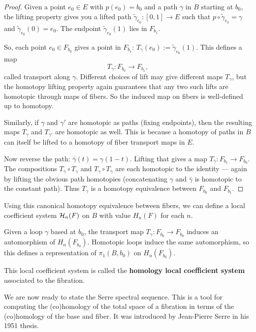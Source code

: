 \documentclass[12pt]{article}
\begin{document}
\begin{proof}
    Given a point $e_0\in E$ with $p(e_0)=b_0$ and a path $\gamma$ in $B$ starting at $b_0$, the lifting property gives you a lifted path $\widetilde\gamma_{e_0} : [0,1]\to E$ such that $p\circ \widetilde\gamma_{e_0} = \gamma$ and $\widetilde\gamma_{e_0}(0)=e_0$. The endpoint $\widetilde\gamma_{e_0}(1)$ lies in $F_{b_1}$.

    So, each point $e_0\in F_{b_0}$ gives a point in $F_{b_1}$: $T_\gamma(e_0) := \widetilde\gamma_{e_0}(1)$. This defines a map
    \[T_\gamma : F_{b_0} \longrightarrow F_{b_1},\]
    called transport along $\gamma$. Different choices of lift may give different maps $T_\gamma$, but the homotopy lifting property again guarantees that any two such lifts are homotopic through maps of fibers. So the induced map on fibers is well-defined up to homotopy.

    Similarly, if $\gamma$ and $\gamma'$ are homotopic as paths (fixing endpoints), then the resulting maps $T_\gamma$ and $T_{\gamma'}$ are homotopic as well. This is because a homotopy of paths in $B$ can itself be lifted to a homotopy of fiber transport maps in $E$.

    Now reverse the path: $\bar\gamma(t) = \gamma(1-t)$. Lifting that gives a map $T_{\bar\gamma}:F_{b_1}\to F_{b_0}$. The compositions $T_{\bar\gamma}\circ T_\gamma$ and $T_\gamma\circ T_{\bar\gamma}$ are each homotopic to the identity — again by lifting the obvious path homotopies (concatenating $\gamma$ and $\bar\gamma$ is homotopic to the constant path). Thus $T_\gamma$ is a homotopy equivalence between $F_{b_0}$ and $F_{b_1}$.
\end{proof}
Using this canonical homotopy equivalence between fibers, we can define a local coefficient system ${\mathcal{H}}_n(F)$ on $B$ with value $H_n(F)$ for each $n$.
\begin{definition}
     Given a loop $\gamma$ based at $b_0$, the transport map $T_\gamma : F_{b_0} \to F_{b_0}$ induces an automorphism of $H_n(F_{b_0})$. Homotopic loops induce the same automorphism, so this defines a representation of $\pi_1(B,b_0)$ on $H_n(F_{b_0})$. 

This local coefficient system is called the \textbf{homology local coefficient system} associated to the fibration. 
\end{definition}

We are now ready to state the Serre spectral sequence. This is a tool for computing the (co)homology of the total space of a fibration in terms of the (co)homology of the base and fiber. It was introduced by Jean-Pierre Serre in his 1951 thesis.
\end{document}
